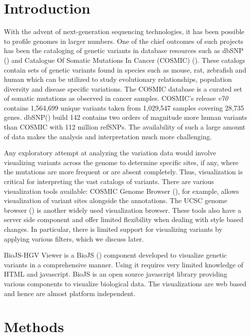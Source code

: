 \documentclass{bioinfo}
\begin{document}
\section{Introduction}

With the advent of next-generation sequencing technologies, it has been possible to profile genomes in larger numbers. One of the chief outcomes of such projects has been the cataloging of genetic variants in database resources such as dbSNP (\cite{Smigielski2000}) and Catalogue Of Somatic Mutations In Cancer (COSMIC) (\cite{Forbes2011}). These catalogs contain sets of genetic variants found in species such as mouse, rat, zebrafish and human which can be utilized to study evolutionary relationships, population diversity and disease specific variations. The COSMIC database is a curated set of somatic mutations as observed in cancer samples. COSMIC's release \textit{v70} contains 1,564,699 unique variants taken from 1,029,547 samples covering 28,735 genes. dbSNP(\cite{sherry2001dbsnp}) build 142 contains two orders of magnitude more human variants than COSMIC with 112 million refSNPs. The availability of such a large amount of data makes the analysis and interpretation much more challenging.

Any exploratory attempt at analyzing the variation data would involve visualizing variants across the genome to determine specific sites, if any, where the mutations are more frequent or are absent completely. Thus, visualization is critical for interpreting the vast catalogs of variants. There are various visualization tools available: COSMIC Genome Browser (\cite{Forbes2011}), for example, allows visualization of variant sites alongside the annotations. The UCSC genome browser (\cite{karolchik2003ucsc}) is another widely used visualization browser. These tools also have a server side component and offer limited flexibility when dealing with style based changes. In particular, there is limited support for visualizing variants by applying various filters, which we discuss later.


BioJS-HGV Viewer is a BioJS (\cite{gomez2013biojs}) component developed to visualize genetic variants in a comprehensive manner. Using it requires very limited knowledge of HTML and javascript. BioJS is an open source javascript library providing various components to visualize biological data. The visualizations are web based and hence are almost platform independent. 

\section{Methods}
\end{document}
